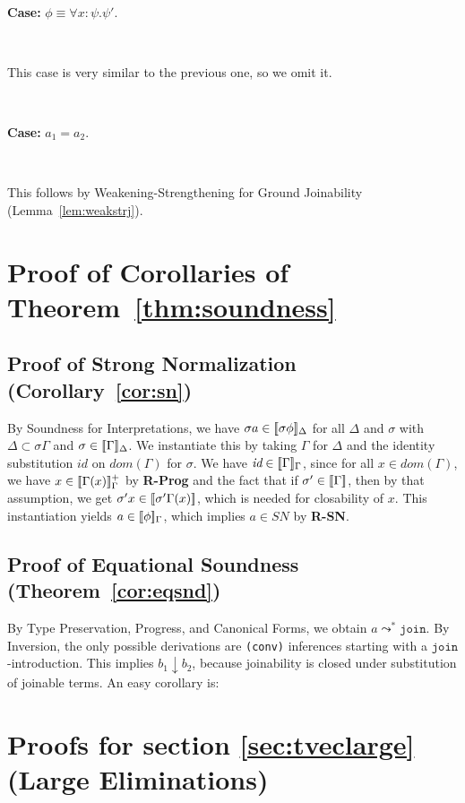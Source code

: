 \documentclass[copyright]{eptcs}
\newcommand{\SN}[0]{\textit{SN}}
\newcommand{\join}[0]{\texttt{join}}
\newcommand{\interp}[1]{[\negthinspace[#1]\negthinspace]}
\begin{document}
\

\noindent \textbf{Case:} $\phi\equiv\forall x:\psi.\psi'$.

\

\noindent This case is very similar to the previous one, so we omit it.

\ 

\noindent \textbf{Case:} $a_1 = a_2$.

\

\noindent This follows by Weakening-Strengthening for Ground
Joinability (Lemma~\ref{lem:weakstrj}).

\section{Proof of Corollaries of Theorem~\ref{thm:soundness}}

\subsection{Proof of Strong Normalization (Corollary~\ref{cor:sn})}

By Soundness for Interpretations,
we have $\sigma a\in\interp{\sigma\phi}_\Delta$ for all $\Delta$ and
$\sigma$ with $\Delta\subset\sigma\Gamma$ and
$\sigma\in\interp{\Gamma}_\Delta$.  We instantiate this by taking
$\Gamma$ for $\Delta$ and the identity substitution $\textit{id}$ on
$\textit{dom}(\Gamma)$ for $\sigma$.  We have
$\textit{id}\in\interp{\Gamma}_\Gamma$, since for all
$x\in\textit{dom}(\Gamma)$, we have $x\in\interp{\Gamma(x)}^+_\Gamma$
by \textbf{R-Prog} and the fact that if $\sigma'\in\interp{\Gamma}$,
then by that assumption, we get $\sigma' x\in\interp{\sigma'
  \Gamma(x)}$, which is needed for closability of $x$.  This
instantiation yields $a\in\interp{\phi}_\Gamma$, which implies
$a\in\SN$ by \textbf{R-SN}.


\subsection{Proof of Equational Soundness (Theorem~\ref{cor:eqsnd})}

By Type Preservation, Progress, and
Canonical Forms, we obtain $a\leadsto^*\join$.  By Inversion, the only
possible derivations are \texttt{(conv)} inferences starting with a
$\join$-introduction.  This implies $b_1\downarrow b_2$, because
joinability is closed under substitution of joinable terms.  An easy
corollary is:

\section{Proofs for section \ref{sec:tveclarge} (Large Eliminations)}
\end{document}
